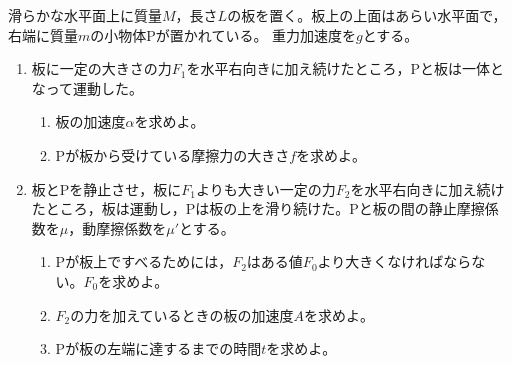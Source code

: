 \item 
    \begin{mawarikomi}{120pt}{}
        滑らかな水平面上に質量$M$，長さ$L$の板を置く。板上の上面はあらい水平面で，右端に質量$m$の小物体Pが置かれている。
        重力加速度を$g$とする。
        \begin{enumerate}
            \item 板に一定の大きさの力$F_1$を水平右向きに加え続けたところ，Pと板は一体となって運動した。
            \begin{enumerate}[(ア)]
                \item 板の加速度$\alpha $を求めよ。
                \item Pが板から受けている摩擦力の大きさ$f$を求めよ。
            \end{enumerate}
            \item 板とPを静止させ，板に$F_1$よりも大きい一定の力$F_2$を水平右向きに加え続けたところ，板は運動し，Pは板の上を滑り続けた。Pと板の間の静止摩擦係数を$\mu $，動摩擦係数を$\mu '$とする。
                \begin{enumerate}[(ア)]
                    \item Pが板上ですべるためには，$F_2$はある値$F_0$より大きくなければならない。$F_0$を求めよ。
                    \item $F_2$の力を加えているときの板の加速度$A$を求めよ。
                    \item Pが板の左端に達するまでの時間$t$を求めよ。
                \end{enumerate}
        \end{enumerate}
    \end{mawarikomi}
